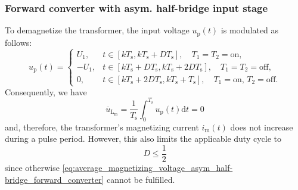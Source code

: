 \begin{frame}
    \frametitle{Forward converter with asym. half-bridge input stage}
    To demagnetize the transformer, the input voltage $u_\mathrm{p}(t)$ is modulated as follows:
    \begin{equation}
        u_\mathrm{p}(t) = \begin{cases}
            U_1, &  t\in[kT_\mathrm{s}, kT_\mathrm{s}+D T_\mathrm{s}], \quad T_1=T_2=\mathrm{on},\\
            -U_1, & t\in[kT_\mathrm{s}+D T_\mathrm{s}, kT_\mathrm{s}+2D T_\mathrm{s}], \quad  T_1=T_2=\mathrm{off},\\
            0, &  t\in[kT_\mathrm{s}+2D T_\mathrm{s}, kT_\mathrm{s}+T_\mathrm{s}], \quad T_1=\mathrm{on},\, T_2=\mathrm{off}.
        \end{cases}  
    \end{equation}
    Consequently, we have
    \begin{equation}
        \overline{u}_\mathrm{L_\mathrm{m}} = \frac{1}{T_\mathrm{s}}\int_{0}^{T_\mathrm{s}}u_\mathrm{p}(t)\mathrm{d}t = 0
    \label{eq:average_magnetizing_voltage_asym_half-bridge_forward_converter}
    \end{equation}
    and, therefore, the transformer's magnetizing current $i_\mathrm{m}(t)$ does not increase during a pulse period. However, this also limits the applicable duty cycle to 
    $$
    D\leq\frac{1}{2}
    $$
    since otherwise \eqref{eq:average_magnetizing_voltage_asym_half-bridge_forward_converter} cannot be fulfilled.
\end{frame}

